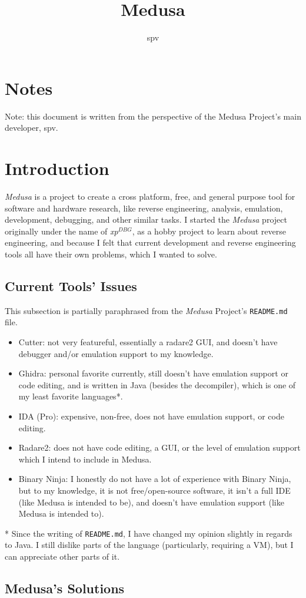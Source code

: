 \documentclass{article}
\title{Medusa}
\author{spv}
\begin{document}
	\maketitle

	\section{Notes}
	Note: this document is written from the perspective of the Medusa Project's
	main developer, spv.

	\section{Introduction}
	\textit{Medusa} is a project to create a cross platform, free, and general
	purpose tool for software and hardware research, like reverse engineering,
	analysis, emulation, development, debugging, and other similar tasks. I
	started the \textit{Medusa} project originally under the name of
	\textit{xp$^{DBG}$}, as a hobby project to learn about reverse engineering,
	and because I felt that current development and reverse engineering tools
	all have their own problems, which I wanted to solve.

	\subsection{Current Tools' Issues}
	This subsection is partially paraphrased from the \textit{Medusa} Project's
	\texttt{README.md} file.

	\begin{itemize}
		\item Cutter: not very featureful, essentially a radare2 GUI, and
		doesn't have debugger and/or emulation support to my knowledge.
		\item Ghidra: personal favorite currently, still doesn't have emulation
		support or code editing, and is written in Java (besides the
		decompiler), which is one of my least favorite languages*.
		\item IDA (Pro): expensive, non-free, does not have emulation support,
		or code editing.
		\item Radare2: does not have code editing, a GUI, or the level of
		emulation support which I intend to include in Medusa.
		\item Binary Ninja: I honestly do not have a lot of experience with
		Binary Ninja, but to my knowledge, it is not free/open-source software,
		it isn't a full IDE (like Medusa is intended to be), and doesn't have
		emulation support (like Medusa is intended to).
	\end{itemize}

	* Since the writing of \texttt{README.md}, I have changed my opinion slightly
	in regards to Java. I still dislike parts of the language (particularly,
	requiring a VM), but I can appreciate other parts of it.

	\subsection{Medusa's Solutions}
\end{document}
